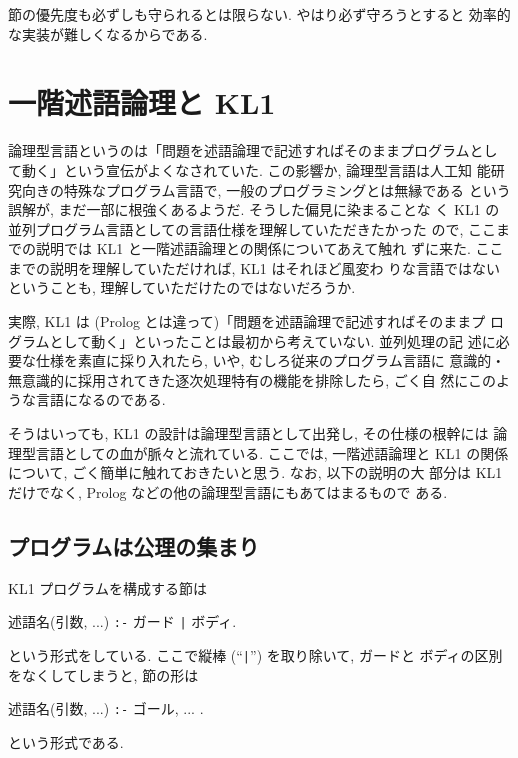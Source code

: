 \documentclass[a4,titlepage]{jsreport}
\newcommand{\commit}{\texttt{|}}
\begin{document}
節の優先度も必ずしも守られるとは限らない.  やはり必ず守ろうとすると
効率的な実装が難しくなるからである.

\section{一階述語論理と KL1}

論理型言語というのは「問題を述語論理で記述すればそのままプログラムとし
て動く」という宣伝がよくなされていた.  この影響か, 論理型言語は人工知
能研究向きの特殊なプログラム言語で, 一般のプログラミングとは無縁である
という誤解が, まだ一部に根強くあるようだ.  そうした偏見に染まることな
く KL1 の並列プログラム言語としての言語仕様を理解していただきたかった
ので, ここまでの説明では KL1 と一階述語論理との関係についてあえて触れ
ずに来た.  ここまでの説明を理解していただければ, KL1 はそれほど風変わ
りな言語ではないということも, 理解していただけたのではないだろうか.

実際, KL1 は (Prolog とは違って)「問題を述語論理で記述すればそのままプ
ログラムとして動く」といったことは最初から考えていない.  並列処理の記
述に必要な仕様を素直に採り入れたら, いや, むしろ従来のプログラム言語に
意識的・無意識的に採用されてきた逐次処理特有の機能を排除したら, ごく自
然にこのような言語になるのである.

そうはいっても, KL1 の設計は論理型言語として出発し, その仕様の根幹には
論理型言語としての血が脈々と流れている.  ここでは, 一階述語論理と KL1 
の関係について, ごく簡単に触れておきたいと思う.  なお, 以下の説明の大
部分は KL1 だけでなく, Prolog などの他の論理型言語にもあてはまるもので
ある.

\subsection{プログラムは公理の集まり}\label{program=axioms}

KL1 プログラムを構成する節は
\begin{center}
述語名(引数, ...) {\tt :-} ガード {\commit} ボディ.
\end{center}
という形式をしている.  ここで縦棒 (``\commit'') を取り除いて, ガードと
ボディの区別をなくしてしまうと, 節の形は
\begin{center}
述語名(引数, ...) {\tt :-} ゴール, ... .
\end{center}
という形式である.
\end{document}
